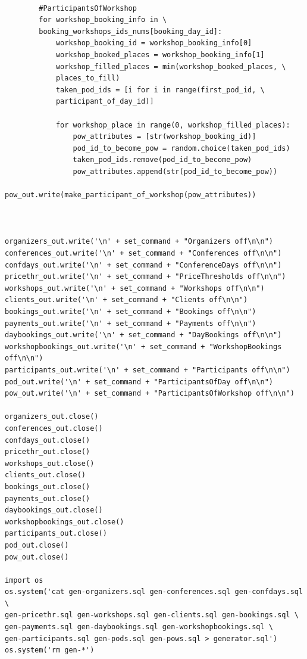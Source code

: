 \documentclass[12pt, a4paper]{mwrep}
\begin{document}
\begin{lstlisting}
            
        #ParticipantsOfWorkshop
        for workshop_booking_info in \
        booking_workshops_ids_nums[booking_day_id]:
            workshop_booking_id = workshop_booking_info[0]
            workshop_booked_places = workshop_booking_info[1]
            workshop_filled_places = min(workshop_booked_places, \
            places_to_fill)                
            taken_pod_ids = [i for i in range(first_pod_id, \
            participant_of_day_id)]                
            
            for workshop_place in range(0, workshop_filled_places):
                pow_attributes = [str(workshop_booking_id)]
                pod_id_to_become_pow = random.choice(taken_pod_ids)
                taken_pod_ids.remove(pod_id_to_become_pow)
                pow_attributes.append(str(pod_id_to_become_pow))
                pow_out.write(make_participant_of_workshop(pow_attributes))
                
            
            
organizers_out.write('\n' + set_command + "Organizers off\n\n")
conferences_out.write('\n' + set_command + "Conferences off\n\n")
confdays_out.write('\n' + set_command + "ConferenceDays off\n\n")
pricethr_out.write('\n' + set_command + "PriceThresholds off\n\n")
workshops_out.write('\n' + set_command + "Workshops off\n\n")
clients_out.write('\n' + set_command + "Clients off\n\n")
bookings_out.write('\n' + set_command + "Bookings off\n\n")
payments_out.write('\n' + set_command + "Payments off\n\n")
daybookings_out.write('\n' + set_command + "DayBookings off\n\n")
workshopbookings_out.write('\n' + set_command + "WorkshopBookings off\n\n")
participants_out.write('\n' + set_command + "Participants off\n\n")
pod_out.write('\n' + set_command + "ParticipantsOfDay off\n\n")
pow_out.write('\n' + set_command + "ParticipantsOfWorkshop off\n\n")

organizers_out.close()
conferences_out.close()
confdays_out.close()
pricethr_out.close()
workshops_out.close()
clients_out.close()
bookings_out.close()
payments_out.close()
daybookings_out.close()
workshopbookings_out.close()
participants_out.close()
pod_out.close()
pow_out.close()

import os
os.system('cat gen-organizers.sql gen-conferences.sql gen-confdays.sql \
gen-pricethr.sql gen-workshops.sql gen-clients.sql gen-bookings.sql \
gen-payments.sql gen-daybookings.sql gen-workshopbookings.sql \
gen-participants.sql gen-pods.sql gen-pows.sql > generator.sql')
os.system('rm gen-*')
\end{lstlisting}
\end{document}
